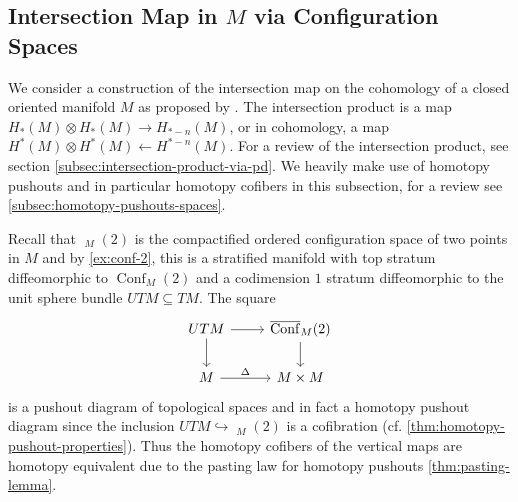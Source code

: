 \documentclass{scrartcl}
\theoremstyle{plain}
\theoremstyle{definition}
\newcommand{\R}{\mathbb R}
\renewcommand{\subset}{\subseteq}
\newcommand{\from}{\leftarrow}
\newcommand{\injto}{\hookrightarrow}
\DeclareMathOperator{\Conf}{Conf}
\DeclareMathOperator{\cConf}{\overline{Conf}}
\begin{document}





\subsection[Intersection Map via Configuration Spaces]{Intersection Map in $M$ via Configuration Spaces}\label{subsec:intersection-in-M-via-conf}

We consider a construction of the intersection map on the cohomology of a closed oriented manifold $M$ as proposed by \cite{naef2019string}. The intersection product is a map $H_*(M) \otimes H_*(M) \to H_{*-n}(M)$, or in cohomology, a map $H^*(M) \otimes H^*(M) \from H^{*-n}(M)$. For a review of the intersection product, see section \ref{subsec:intersection-product-via-pd}. We heavily make use of homotopy pushouts and in particular homotopy cofibers in this subsection, for a review see \cref{subsec:homotopy-pushouts-spaces}. 

Recall that $\cConf_M(2)$ is the compactified ordered configuration space of two points in $M$ and by \cref{ex:conf-2}, this is a stratified manifold with top stratum diffeomorphic to $\Conf_M(2)$ and a codimension $1$ stratum diffeomorphic to the unit sphere bundle $UTM\subset TM$. The square
\begin{equation}\label{M_pushout_1}
\begin{tikzcd}
    UTM \dar\rar & \cConf_M(2)\dar \\
    M \rar["\Delta"] & M\times M
\end{tikzcd}
\end{equation}
is a pushout diagram of topological spaces and in fact a homotopy pushout diagram since the inclusion $UTM \injto \cConf_M(2)$ is a cofibration (cf. \cref{thm:homotopy-pushout-properties}). Thus the homotopy cofibers of the vertical maps are homotopy equivalent due to the pasting law for homotopy pushouts \cref{thm:pasting-lemma}. 
\end{document}

